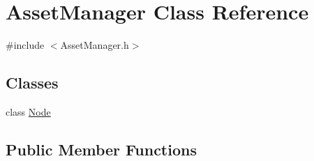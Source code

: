 \hypertarget{class_asset_manager}{}\section{Asset\+Manager Class Reference}
\label{class_asset_manager}


{\ttfamily \#include $<$Asset\+Manager.\+h$>$}

\subsection*{Classes}
\begin{DoxyCompactItemize}
\item 
class \hyperlink{class_asset_manager_1_1_node}{Node}
\end{DoxyCompactItemize}
\subsection*{Public Member Functions}
